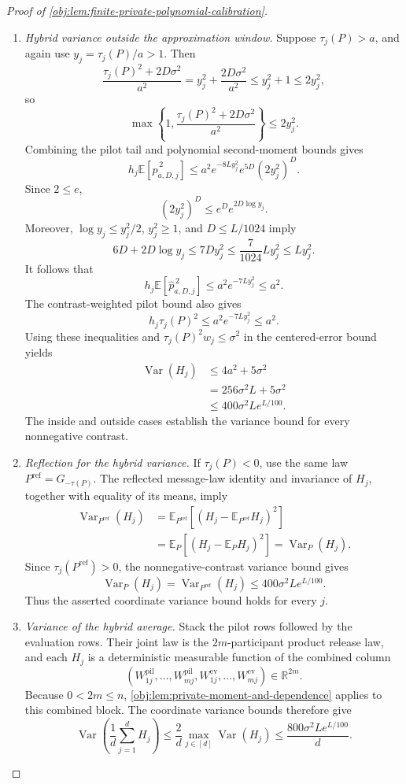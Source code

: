 \begin{proof}[Proof of \cref{obj:lem:finite-private-polynomial-calibration}]
\begin{enumerate}
\item \textit{Hybrid variance outside the approximation window.}
Suppose \(\tau_j(P)>a\), and again use \(y_j=\tau_j(P)/a>1\). Then
\[
\frac{\tau_j(P)^2+2D\sigma^2}{a^2}
=y_j^2+\frac{2D\sigma^2}{a^2}
\le y_j^2+1
\le2y_j^2,
\]
so
\[
\max\left\{1,\frac{\tau_j(P)^2+2D\sigma^2}{a^2}\right\}
\le2y_j^2.
\]
Combining the pilot tail and polynomial second-moment bounds gives
\[
h_j\mathbb E[\widehat p_{a,D,j}^{\,2}]
\le a^2e^{-8Ly_j^2}e^{5D}(2y_j^2)^D.
\]
Since \(2\le e\),
\[
(2y_j^2)^D\le e^D e^{2D\log y_j}.
\]
Moreover, \(\log y_j\le y_j^2/2\), \(y_j^2\ge1\), and \(D\le L/1024\) imply
\[
6D+2D\log y_j
\le7Dy_j^2
\le\frac7{1024}Ly_j^2
\le Ly_j^2.
\]
It follows that
\[
h_j\mathbb E[\widehat p_{a,D,j}^{\,2}]
\le a^2e^{-7Ly_j^2}\le a^2.
\]
The contrast-weighted pilot bound also gives
\[
h_j\tau_j(P)^2\le a^2e^{-7Ly_j^2}\le a^2.
\]
Using these inequalities and \(\tau_j(P)^2w_j\le\sigma^2\) in the centered-error bound yields
\[
\begin{aligned}
\operatorname{Var}(H_j)
&\le4a^2+5\sigma^2\\
&=256\sigma^2L+5\sigma^2\\
&\le400\sigma^2Le^{L/100}.
\end{aligned}
\]
The inside and outside cases establish the variance bound for every nonnegative contrast.

\item \textit{Reflection for the hybrid variance.}
If \(\tau_j(P)<0\), use the same law \(P^{\mathrm{ref}}=G_{-\tau(P)}\). The reflected message-law identity and invariance of \(H_j\), together with equality of its means, imply
\[
\begin{aligned}
\operatorname{Var}_{P^{\mathrm{ref}}}(H_j)
&=\mathbb E_{P^{\mathrm{ref}}}
       [(H_j-\mathbb E_{P^{\mathrm{ref}}}H_j)^2]\\
&=\mathbb E_P[(H_j-\mathbb E_PH_j)^2]
=\operatorname{Var}_P(H_j).
\end{aligned}
\]
Since \(\tau_j(P^{\mathrm{ref}})>0\), the nonnegative-contrast variance bound gives
\[
\operatorname{Var}_P(H_j)
=\operatorname{Var}_{P^{\mathrm{ref}}}(H_j)
\le400\sigma^2Le^{L/100}.
\]
Thus the asserted coordinate variance bound holds for every \(j\).

\item \textit{Variance of the hybrid average.}
Stack the pilot rows followed by the evaluation rows. Their joint law is the \(2m\)-participant product release law, and each \(H_j\) is a deterministic measurable function of the combined column
\[
(W^{\mathrm{pil}}_{1j},\ldots,W^{\mathrm{pil}}_{mj},
 W^{\mathrm{ev}}_{1j},\ldots,W^{\mathrm{ev}}_{mj})
\in\mathbb R^{2m}.
\]
Because \(0<2m\le n\), \cref{obj:lem:private-moment-and-dependence} applies to this combined block. The coordinate variance bounds therefore give
\[
\operatorname{Var}\left(\frac1d\sum_{j=1}^dH_j\right)
\le\frac2d\max_{j\in[d]}\operatorname{Var}(H_j)
\le\frac{800\sigma^2Le^{L/100}}d.
\]


\end{enumerate}
\end{proof}
